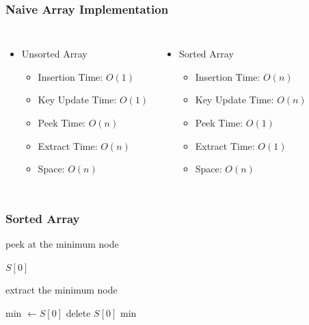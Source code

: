 \documentclass{beamer}
\begin{document}
\begin{frame}
	\frametitle{Naive Array Implementation} 
	\begin{columns}
	\begin{itemize}
		\item Unsorted Array
		\begin{itemize}
			\item Insertion Time: \( O(1) \) 			
			\item Key Update Time: \( O(1) \) 
			\item Peek Time: \( O(n) \) 
			\item Extract Time: \( O(n) \) 
			\item Space: \( O(n) \) 
		\end{itemize}
	\end{itemize}
	
	\begin{itemize}
		\item Sorted Array
		\begin{itemize}
			\item Insertion Time: \( O(n) \) 
			\item Key Update Time: \( O(n) \) 
			\item Peek Time: \( O(1) \) 
			\item Extract Time: \( O(1) \) 
			\item Space: \( O(n) \) 
		\end{itemize}
	\end{itemize}
	\end{columns}
\end{frame}

\begin{frame}
	\frametitle{Sorted Array}
	\begin{algorithm}[H]
		\caption{peek at the minimum node}
		\begin{algorithmic}[1]
			\State \Return $S[0]$
		\EndFunction
		\end{algorithmic}
	\end{algorithm}

	\begin{algorithm}[H]
		\caption{extract the minimum node}
		\begin{algorithmic}[1]
		\State min \( \leftarrow S[0]\) 
		\State delete $S[0]$
		\State \Return min
		\EndFunction
		\end{algorithmic}
	\end{algorithm}
\end{frame}
\end{document}
